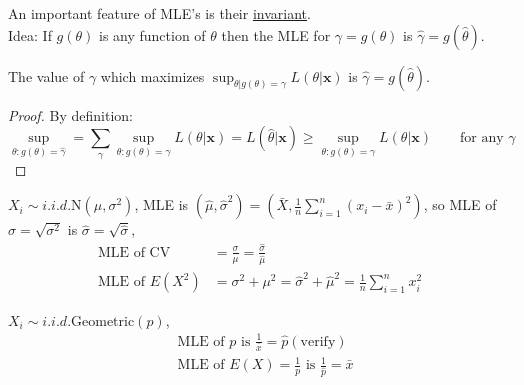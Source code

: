 \documentclass[english, 11pt]{article}
\begin{document}
An important feature of MLE's is their \underline{invariant}. \\
Idea: If $g(\theta)$ is any function of $\theta$ then the MLE for $\gamma=g(\theta)$ is $\hat{\gamma}=g(\hat{\theta})$.

\begin{thrm}\label{thrm:319}
The value of $\gamma$ which maximizes $\sup_{\theta|g(\theta)=\gamma}L(\theta|\bm{x})$ is $\hat{\gamma}=g(\hat{\theta})$. 
\end{thrm}
\begin{proof}
By definition:
$$
\sup_{\theta:g(\theta)=\hat{\gamma}}=\sum_\gamma\sup_{\theta:g(\theta)=\gamma}L(\theta|\bm{x})=L(\hat{\theta}|\bm{x})\geqslant \sup_{\theta:g(\theta)=\gamma}L(\theta|\bm{x})\qquad\text{for any }\gamma
$$
\end{proof}

\begin{exmp}
$X_i\sim i.i.d.\text{N}(\mu, \sigma^2)$, MLE is $(\hat{\mu}, \hat{\sigma}^2)=(\bar{X}, \frac{1}{n}\sum_{i=1}^n(x_i-\bar{x})^2)$, so MLE of $\sigma=\sqrt{\sigma^2}$ is $\hat{\sigma}=\sqrt{\hat{\sigma}}$, 
$$
\begin{aligned}
\text{MLE of CV}&=\frac{\sigma}{\mu}=\frac{\hat{\sigma}}{\hat{\mu}}\\
\text{MLE of }E(X^2)&=\sigma^2+\mu^2=\hat{\sigma}^2+\hat{\mu}^2=\frac{1}{n}\sum_{i=1}^nx_i^2
\end{aligned}
$$
\end{exmp}


\begin{exmp}
$X_i\sim i.i.d. \text{Geometric}(p)$, 
$$
\begin{aligned}
&\text{MLE of }p\text{ is }\frac{1}{\bar{x}}=\hat{p}(\text{verify})\\
&\text{MLE of }E(X)=\frac{1}{p}\text{ is }\frac{1}{\hat{p}}=\bar{x}
\end{aligned}
$$
\end{exmp}
\end{document}
